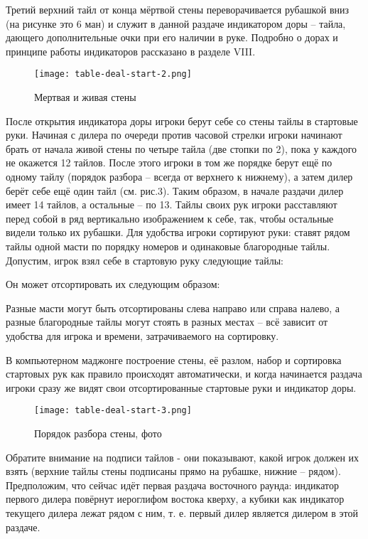 Третий верхний тайл от конца мёртвой стены переворачивается рубашкой вниз (на рисунке это 6 ман) и служит в данной раздаче индикатором доры – тайла, дающего дополнительные очки при его наличии в руке. Подробно о дорах и принципе работы индикаторов рассказано в разделе VIII.

\begin{figure}[H]
	\centering
	\texttt{[image: table-deal-start-2.png]}
	\caption{Мертвая и живая стены}
\end{figure}

После открытия индикатора доры игроки берут себе со стены тайлы в стартовые руки. Начиная с дилера по очереди против часовой стрелки игроки начинают брать от начала живой стены по четыре тайла (две стопки по 2), пока у каждого не окажется 12 тайлов. После этого игроки в том же порядке берут ещё по одному тайлу (порядок разбора – всегда от верхнего к нижнему), а затем дилер берёт себе ещё один тайл (см. рис.3). Таким образом, в начале раздачи дилер имеет 14 тайлов, а остальные – по 13. Тайлы своих рук игроки расставляют перед собой в ряд вертикально изображением к себе, так, чтобы остальные видели только их рубашки. Для удобства игроки сортируют руки: ставят рядом тайлы одной масти по порядку номеров и одинаковые благородные тайлы. Допустим, игрок взял себе в стартовую руку следующие тайлы:


Он может отсортировать их следующим образом:


Разные масти могут быть отсортированы слева направо или справа налево, а разные благородные тайлы могут стоять в разных местах – всё зависит от удобства для игрока и времени, затрачиваемого на сортировку.

В компьютерном маджонге построение стены, её разлом, набор и сортировка стартовых рук как правило происходят автоматически, и когда начинается раздача игроки сразу же видят свои отсортированные стартовые руки и индикатор доры. 

\begin{figure}[H]
	\centering
	\texttt{[image: table-deal-start-3.png]}
	\caption{Порядок разбора стены, фото}
\end{figure}

Обратите внимание на подписи тайлов - они показывают, какой игрок должен их взять (верхние тайлы стены подписаны прямо на рубашке, нижние – рядом). Предположим, что сейчас идёт первая раздача восточного раунда: индикатор первого дилера повёрнут иероглифом востока кверху, а кубики как индикатор текущего дилера лежат рядом с ним, т. е. первый дилер является дилером в этой раздаче.

